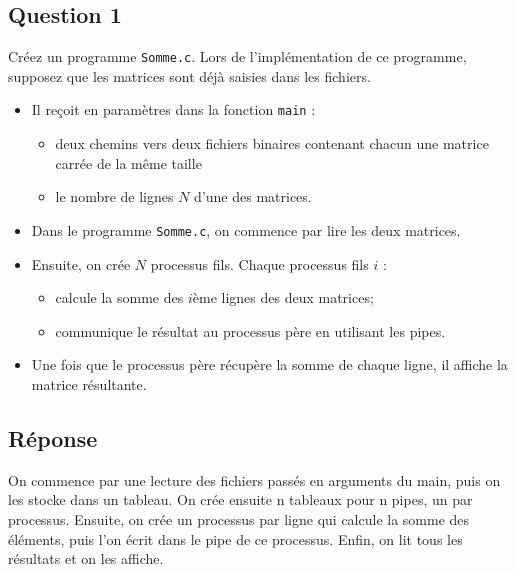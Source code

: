 \documentclass[
	12pt, %
]{fphw}
\begin{document}
\subsection*{Question 1}
\begin{problem}
Créez un programme \texttt{Somme.c}. Lors de l'implémentation de ce programme, supposez que les matrices sont déjà saisies dans les fichiers.
\begin{itemize}
	\item Il reçoit en paramètres dans la fonction \texttt{main} :
	\begin{itemize}
		\item deux chemins vers deux fichiers binaires contenant chacun une matrice carrée de la même taille 
		\item le nombre de lignes $N$ d'une des matrices. 
	\end{itemize}
	\item Dans le programme \texttt{Somme.c}, on commence par lire les deux matrices. 
	\item Ensuite, on crée $N$ processus fils. Chaque processus fils $i$ :
	\begin{itemize}
		\item calcule la somme des $i$ème lignes des deux matrices;
		\item communique le résultat au processus père en utilisant les pipes. 
	\end{itemize} 
	\item Une fois que le processus père récupère la somme de chaque ligne, il affiche la matrice résultante.
\end{itemize}
\end{problem}
\subsection*{Réponse}

On commence par une lecture des fichiers passés en arguments du main, puis on les stocke dans un tableau.
On crée ensuite n tableaux pour n pipes, un par processus.
Ensuite, on crée un processus par ligne qui calcule la somme des éléments, puis l'on écrit dans le pipe de ce processus.
Enfin, on lit tous les résultats et on les affiche.
%
\end{document}
